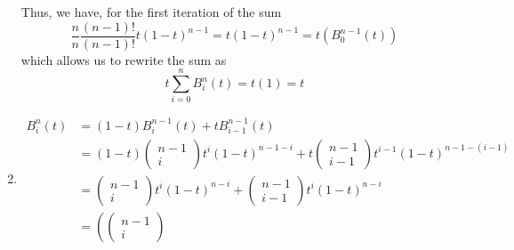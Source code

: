 \begin{enumerate}
\[        \]
        Thus, we have, for the first iteration of the sum 
        \[
            \frac{ n   }{ n  } \frac{ \left( n-1\right) ! }{ \left( n-1\right) ! }  
            t\left( 1-t\right) ^{n-1} = t\left( 1-t\right) ^{n-1} = t \left( B _{ 0 }^{
            n-1 } (t) \right) 
        \]
        which allows us to rewrite the sum as 
        \[
            t\sum_{i=0}^{n} B _{ i }^{ n  } (t)  = t\left( 1\right) = t
        \]
    \item 
        \begin{align*}
            B _{ i }^{ n  } (t) &= \left( 1-t\right) B _{ i }^{ n-1 } (t) + tB _{ i-1 }^{
            n-1 } (t) \\
                                &= \left( 1-t\right) \begin{pmatrix*}
                                    n-1  \\
                                     i 
                                \end{pmatrix*}
                                t^i\left( 1-t\right)^{n-1-i} + t 
                                \begin{pmatrix*}
                                    n-1  \\
                                    i-1  
                                \end{pmatrix*}
                                t^{i-1}\left( 1-t\right) ^{n-1 - (i-1)}\\ 
                                 &= \begin{pmatrix*}
                                     n-1  \\
                                     i  
                                 \end{pmatrix*}
                                 t^i\left( 1-t\right) ^{n-i} +
                                 \begin{pmatrix*}
                                     n-1  \\
                                     i-1  
                                 \end{pmatrix*}
                                 t^i\left( 1-t\right) ^{n-i}\\
                                  &= \left( \begin{pmatrix*}
                                      n-1  \\
                                      i  
                                  \end{pmatrix*}

\end{align*}
\end{enumerate}
